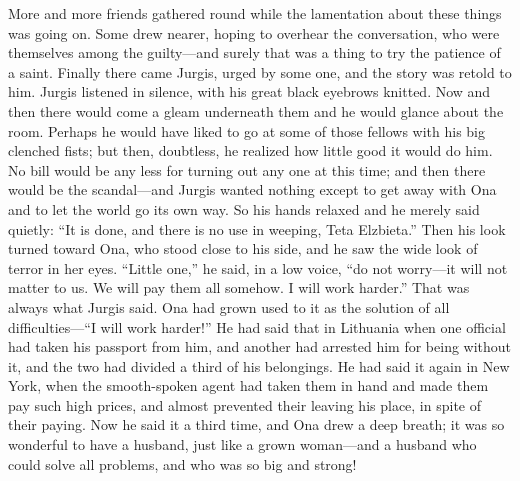 \documentclass[
]{book}
\theoremstyle{definition}
\theoremstyle{definition}
\theoremstyle{definition}
\theoremstyle{definition}
\theoremstyle{remark}
\begin{document}
More and more friends gathered round while the lamentation about these things was going on. Some drew nearer, hoping to overhear the conversation, who were themselves among the guilty---and surely that was a thing to try the patience of a saint. Finally there came Jurgis, urged by some one, and the story was retold to him. Jurgis listened in silence, with his great black eyebrows knitted. Now and then there would come a gleam underneath them and he would glance about the room. Perhaps he would have liked to go at some of those fellows with his big clenched fists; but then, doubtless, he realized how little good it would do him. No bill would be any less for turning out any one at this time; and then there would be the scandal---and Jurgis wanted nothing except to get away with Ona and to let the world go its own way. So his hands relaxed and he merely said quietly: ``It is done, and there is no use in weeping, Teta Elzbieta.'' Then his look turned toward Ona, who stood close to his side, and he saw the wide look of terror in her eyes. ``Little one,'' he said, in a low voice, ``do not worry---it will not matter to us. We will pay them all somehow. I will work harder.'' That was always what Jurgis said. Ona had grown used to it as the solution of all difficulties---``I will work harder!'' He had said that in Lithuania when one official had taken his passport from him, and another had arrested him for being without it, and the two had divided a third of his belongings. He had said it again in New York, when the smooth-spoken agent had taken them in hand and made them pay such high prices, and almost prevented their leaving his place, in spite of their paying. Now he said it a third time, and Ona drew a deep breath; it was so wonderful to have a husband, just like a grown woman---and a husband who could solve all problems, and who was so big and strong!
\end{document}
